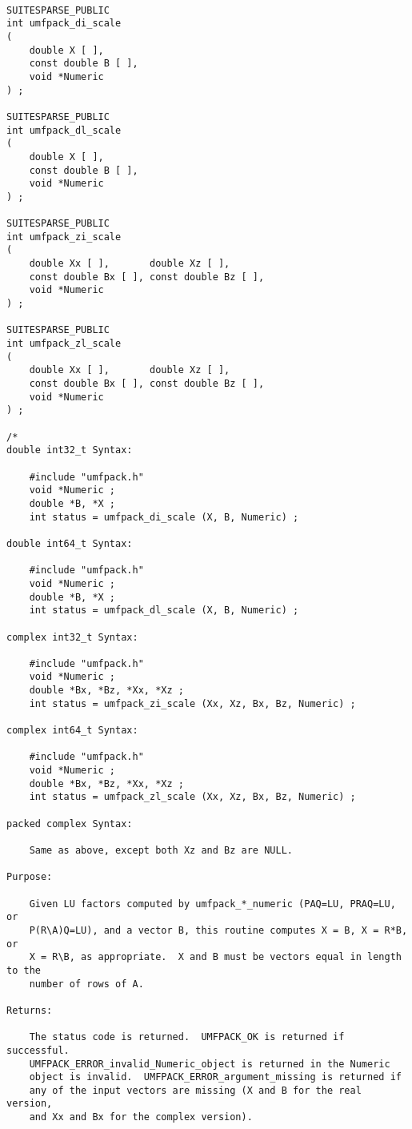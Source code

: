 \documentclass[11pt]{article}
\begin{document}
{\footnotesize
\begin{verbatim}

SUITESPARSE_PUBLIC
int umfpack_di_scale
(
    double X [ ],
    const double B [ ],
    void *Numeric
) ;

SUITESPARSE_PUBLIC
int umfpack_dl_scale
(
    double X [ ],
    const double B [ ],
    void *Numeric
) ;

SUITESPARSE_PUBLIC
int umfpack_zi_scale
(
    double Xx [ ],       double Xz [ ],
    const double Bx [ ], const double Bz [ ],
    void *Numeric
) ;

SUITESPARSE_PUBLIC
int umfpack_zl_scale
(
    double Xx [ ],       double Xz [ ],
    const double Bx [ ], const double Bz [ ],
    void *Numeric
) ;

/*
double int32_t Syntax:

    #include "umfpack.h"
    void *Numeric ;
    double *B, *X ;
    int status = umfpack_di_scale (X, B, Numeric) ;

double int64_t Syntax:

    #include "umfpack.h"
    void *Numeric ;
    double *B, *X ;
    int status = umfpack_dl_scale (X, B, Numeric) ;

complex int32_t Syntax:

    #include "umfpack.h"
    void *Numeric ;
    double *Bx, *Bz, *Xx, *Xz ;
    int status = umfpack_zi_scale (Xx, Xz, Bx, Bz, Numeric) ;

complex int64_t Syntax:

    #include "umfpack.h"
    void *Numeric ;
    double *Bx, *Bz, *Xx, *Xz ;
    int status = umfpack_zl_scale (Xx, Xz, Bx, Bz, Numeric) ;

packed complex Syntax:

    Same as above, except both Xz and Bz are NULL.

Purpose:

    Given LU factors computed by umfpack_*_numeric (PAQ=LU, PRAQ=LU, or
    P(R\A)Q=LU), and a vector B, this routine computes X = B, X = R*B, or
    X = R\B, as appropriate.  X and B must be vectors equal in length to the
    number of rows of A.

Returns:

    The status code is returned.  UMFPACK_OK is returned if successful.
    UMFPACK_ERROR_invalid_Numeric_object is returned in the Numeric
    object is invalid.  UMFPACK_ERROR_argument_missing is returned if
    any of the input vectors are missing (X and B for the real version,
    and Xx and Bx for the complex version).


\end{verbatim}}
\end{document}

